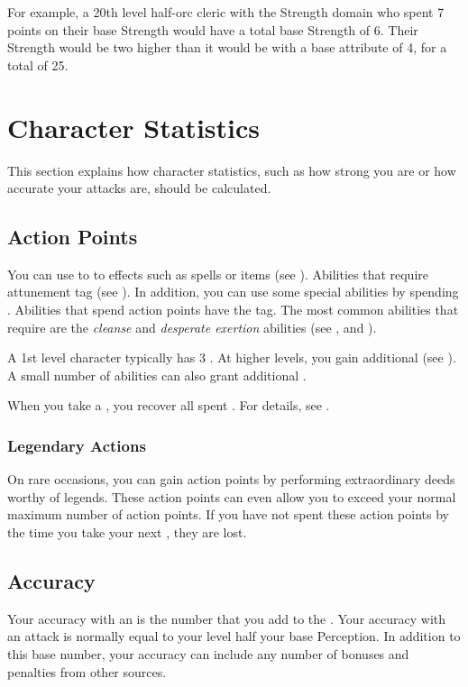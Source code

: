         For example, a 20th level half-orc cleric with the Strength domain who spent 7 points on their base Strength would have a total base Strength of 6.
        Their Strength would be two higher than it would be with a base attribute of 4, for a total of 25.

\section{Character Statistics}
    This section explains how character statistics, such as how strong you are or how accurate your attacks are, should be calculated.

    \subsection{Action Points}\label{Action Points}
        You can use  to  to effects such as spells or items (see ).
        Abilities that require attunement  tag (see ).
        In addition, you can use some special abilities by spending .
        Abilities that spend action points have the  tag.
        The most common abilities that require  are the \textit{cleanse} and \textit{desperate exertion} abilities (see , and ).

        A 1st level character typically has 3 .
        At higher levels, you gain additional  (see ).
        A small number of abilities can also grant additional .

        When you take a , you recover all spent .
        For details, see .

        \subsubsection{Legendary Actions}
            On rare occasions, you can gain action points by performing extraordinary deeds worthy of legends.
            These action points can even allow you to exceed your normal maximum number of action points.
            If you have not spent these action points by the time you take your next , they are lost.

    \subsection{Accuracy}\label{Accuracy}
        Your accuracy with an  is the number that you add to the .
        Your accuracy with an attack is normally equal to your level \add half your base Perception.
        In addition to this base number, your accuracy can include any number of bonuses and penalties from other sources.

